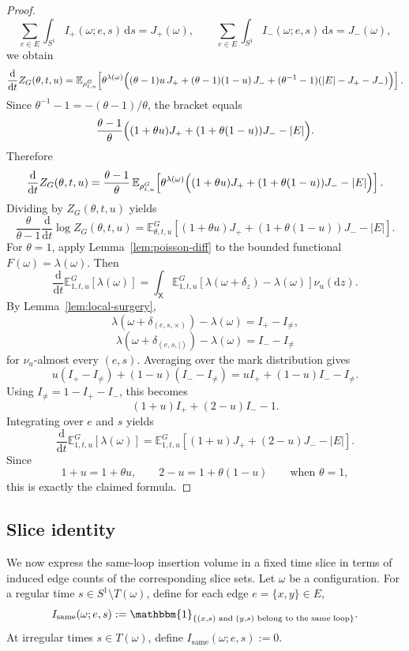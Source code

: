 \documentclass[11pt]{article}
\theoremstyle{remark}
\theoremstyle{plain}
\newcommand{\Ebb}{\mathbb{E}}
\newcommand{\1}{\mathbbm{1}}
\newcommand{\dd}{\mathrm{d}}
\begin{document}
\begin{proof}
\[
\sum_{e\in E}\int_{S^1} I_+(\omega;e,s)\,\dd s = J_+(\omega),
\qquad
\sum_{e\in E}\int_{S^1} I_-(\omega;e,s)\,\dd s = J_-(\omega),
\]
we obtain
\[
\frac{\dd}{\dd t}Z_G(\theta,t,u)
=
\Ebb_{\rho_{t,u}^G}\!\left[
\theta^{\lambda(\omega)}
\Bigl(
(\theta-1)u\,J_+
+
(\theta-1)(1-u)\,J_-
+
(\theta^{-1}-1)(|E|-J_+-J_-)
\Bigr)
\right].
\]
Since \(\theta^{-1}-1=-(\theta-1)/\theta\), the bracket equals
\[
\frac{\theta-1}{\theta}
\Bigl(
(1+\theta u)J_+ + (1+\theta(1-u))J_- - |E|
\Bigr).
\]
Therefore
\[
\frac{\dd}{\dd t}Z_G(\theta,t,u)
=
\frac{\theta-1}{\theta}\,
\Ebb_{\rho_{t,u}^G}\!\left[
\theta^{\lambda(\omega)}
\Bigl(
(1+\theta u)J_+ + (1+\theta(1-u))J_- - |E|
\Bigr)
\right].
\]
Dividing by \(Z_G(\theta,t,u)\) yields
\[
\frac{\theta}{\theta-1}\frac{\dd}{\dd t}\log Z_G(\theta,t,u)
=
\Ebb_{\theta,t,u}^G\!\left[
(1+\theta u)J_+ + (1+\theta(1-u))J_- - |E|
\right].
\]
For \(\theta=1\), apply Lemma~\ref{lem:poisson-diff} to the bounded functional
\(F(\omega)=\lambda(\omega)\). Then
\[
\frac{\dd}{\dd t}\Ebb_{1,t,u}^G[\lambda(\omega)]
=
\int_{\mathsf X}
\Ebb_{1,t,u}^G\!\left[
\lambda(\omega+\delta_z)-\lambda(\omega)
\right]\nu_u(\dd z).
\]
By Lemma~\ref{lem:local-surgery},
\[
\lambda(\omega+\delta_{(e,s,\times)})-\lambda(\omega)=I_+-I_{\neq},
\]
\[
\lambda(\omega+\delta_{(e,s,\mid)})-\lambda(\omega)=I_--I_{\neq}
\]
for \(\nu_u\)-almost every \((e,s)\). Averaging over the mark distribution gives
\[
u(I_+-I_{\neq})+(1-u)(I_--I_{\neq})
=
uI_+ + (1-u)I_- - I_{\neq}.
\]
Using \(I_{\neq}=1-I_+-I_-\), this becomes
\[
(1+u)I_+ + (2-u)I_- - 1.
\]
Integrating over \(e\) and \(s\) yields
\[
\frac{\dd}{\dd t}\Ebb_{1,t,u}^G[\lambda(\omega)]
=
\Ebb_{1,t,u}^G\!\left[
(1+u)J_+ + (2-u)J_- - |E|
\right].
\]
Since
\[
1+u=1+\theta u,
\qquad
2-u=1+\theta(1-u)
\qquad\text{when }\theta=1,
\]
this is exactly the claimed formula.
\end{proof}

\subsection{Slice identity}

We now express the same-loop insertion volume in a fixed time slice in terms of
induced edge counts of the corresponding slice sets.
Let \(\omega\) be a configuration. For a regular time \(s\in S^1\setminus T(\omega)\),
define for each edge \(e=\{x,y\}\in E\),
\[
I_{\mathrm{same}}(\omega;e,s)
:=
\1_{\{(x,s)\text{ and }(y,s)\text{ belong to the same loop}\}}.
\]
At irregular times \(s\in T(\omega)\), define \(I_{\mathrm{same}}(\omega;e,s):=0\).
\end{document}
